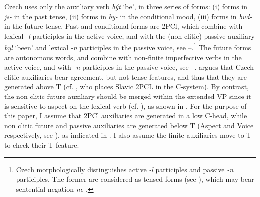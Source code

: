 \documentclass[output=paper,colorlinks,citecolor=brown,
modfonts
]{langscibook}
\begin{document}
Czech uses only the auxiliary verb \textit{být} `be', in three series of forms: (i) forms in \textit{js-} in the past tense, (ii) forms in \textit{by-} in the conditional mood, (iii) forms in \textit{bud-} in the future tense. Past and conditional forms are 2PCl, which combine with lexical \textit{-l} participles in the active voice, and with the (non-clitic) passive auxiliary \textit{byl} `been' and lexical \textit{-n} participles in the passive voice, see --.\footnote{Czech morphologically distinguishes active \textit{-l} participles and passive \textit{-n} participles. The former are considered as tensed forms (see \citealt{Veselovská1995,Veselovská2008}), which may bear sentential negation \textit{ne-}.} The future forms are autonomous words, and combine with non-finite imperfective verbs in the active voice, and with \textit{-n} participles in the passive voice, see --. \cite{Veselovská1995,Veselovská2008} argues that Czech clitic auxiliaries bear agreement, but not tense features, and thus that they are generated above T (cf. \citealt{Roberts2010}, who places Slavic 2PCL in the C-system). By contrast, the non clitic future auxiliary should be merged within the extended VP since it is sensitive to aspect on the lexical verb (cf. \citealt{Kyncl2008}), as shown in . For the purpose of this paper, I assume that 2PCl auxiliaries are generated in a low C-head, while non clitic future and passive auxiliaries are generated below T (Aspect and Voice respectively, see \citealt{Cinque2004}), as indicated in . I also assume the finite auxiliaries move to T to check their T-feature.  
\end{document}
